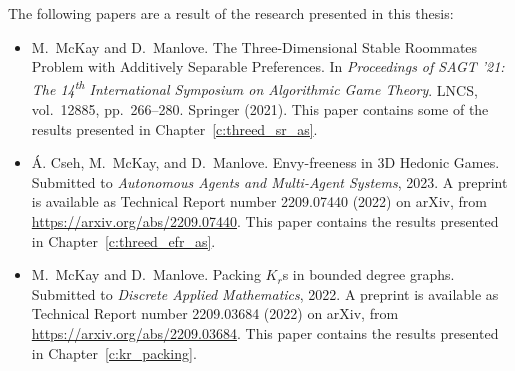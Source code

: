 The following papers are a result of the research presented in this thesis:
\begin{itemize}
    \item M.\ McKay and D.\ Manlove. The Three-Dimensional Stable Roommates Problem with Additively Separable Preferences. In \emph{Proceedings of SAGT '21: The 14\textsuperscript{th} International Symposium on Algorithmic Game Theory}. LNCS, vol.\ 12885, pp.\ 266--280. Springer (2021). %
    This paper contains some of the results presented in Chapter~\ref{c:threed_sr_as}.
    
    \item \'A. Cseh, M.\ McKay, and D.\ Manlove. Envy-freeness in 3D Hedonic Games. Submitted to \emph{Autonomous Agents and Multi-Agent Systems}, 2023. A preprint is available as Technical Report number 2209.07440 (2022) on arXiv, from \url{https://arxiv.org/abs/2209.07440}. This paper contains the results presented in Chapter~\ref{c:threed_efr_as}.
    
    \item M.\ McKay and D.\ Manlove. Packing $K_r$s in bounded degree graphs. Submitted to \emph{Discrete Applied Mathematics}, 2022. A preprint is available as Technical Report number 2209.03684 (2022) on arXiv, from \url{https://arxiv.org/abs/2209.03684}. This paper contains the results presented in Chapter~\ref{c:kr_packing}.
\end{itemize}